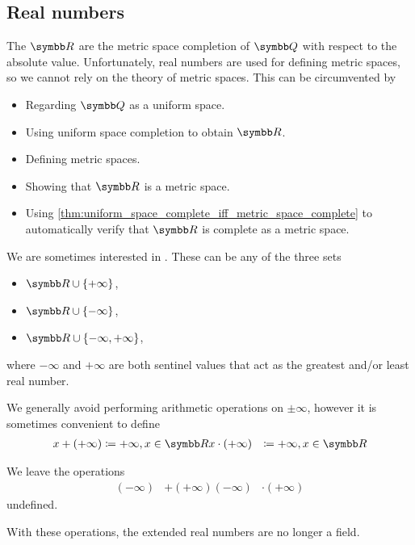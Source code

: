 \subsection{Real numbers}\label{subsec:real_numbers}

\begin{definition}\label{def:real_numbers}
  The  \( \BR \) are the metric space completion of \( \BQ \) with respect to the absolute value. Unfortunately, real numbers are used for defining metric spaces, so we cannot rely on the theory of metric spaces. This can be circumvented by
  \begin{itemize}
    \item Regarding \( \BQ \) as a uniform space.
    \item Using uniform space completion to obtain \( \BR \).
    \item Defining metric spaces.
    \item Showing that \( \BR \) is a metric space.
    \item Using \cref{thm:uniform_space_complete_iff_metric_space_complete} to automatically verify that \( \BR \) is complete as a metric space.
  \end{itemize}
\end{definition}

\begin{definition}\label{def:extended_real_numbers}
  We are sometimes interested in . These can be any of the three sets
  \begin{itemize}
    \item \( \BR \cup \{ +\infty \} \),
    \item \( \BR \cup \{ -\infty \} \),
    \item \( \BR \cup \{ -\infty, +\infty \} \),
  \end{itemize}
  where \( -\infty \) and \( +\infty \) are both sentinel values that act as the greatest and/or least real number.

  We generally avoid performing arithmetic operations on \( \pm \infty \), however it is sometimes convenient to define
  \begin{align*}
    x + (+\infty) &\coloneqq +\infty, x \in \BR
    x \cdot (+\infty) &\coloneqq +\infty, x \in \BR
  \end{align*}

  We leave the operations
  \begin{align*}
    (-\infty) &+ (+\infty)
    (-\infty) &\cdot (+\infty)
  \end{align*}
  undefined.

  With these operations, the extended real numbers are no longer a field.
\end{definition}

